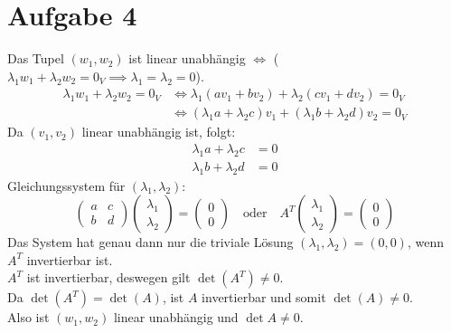 \documentclass{article}
\begin{document}
\section*{Aufgabe 4}
Das Tupel $(w_1, w_2)$ ist linear unabhängig $\iff$ ($\lambda_1 w_1 + \lambda_2 w_2 = 0_V \implies \lambda_1 = \lambda_2 = 0$).
\begin{align*} \lambda_1 w_1 + \lambda_2 w_2 = 0_V &\iff \lambda_1 (a v_1 + b v_2) + \lambda_2 (c v_1 + d v_2) = 0_V \\ &\iff (\lambda_1 a + \lambda_2 c) v_1 + (\lambda_1 b + \lambda_2 d) v_2 = 0_V\end{align*}
Da $(v_1, v_2)$ linear unabhängig ist, folgt:
\begin{align*} \lambda_1 a + \lambda_2 c &= 0 \\ \lambda_1 b + \lambda_2 d &= 0 \end{align*}
Gleichungssystem für $(\lambda_1, \lambda_2)$:
$$ \begin{pmatrix} a & c \\ b & d \end{pmatrix} \begin{pmatrix} \lambda_1 \\ \lambda_2 \end{pmatrix} = \begin{pmatrix} 0 \\ 0 \end{pmatrix} \quad \text{oder} \quad A^T \begin{pmatrix} \lambda_1 \\ \lambda_2 \end{pmatrix} = \begin{pmatrix} 0 \\ 0 \end{pmatrix} $$
Das System hat genau dann nur die triviale Lösung $(\lambda_1, \lambda_2) = (0, 0)$, wenn $A^T$ invertierbar ist. \\
$A^T$ ist invertierbar, deswegen gilt $\det(A^T) \neq 0$. \\
Da $\det(A^T) = \det(A)$, ist $A$ invertierbar und somit $\det(A) \neq 0$. \\
Also ist $(w_1, w_2)$ linear unabhängig und $\det A \neq 0$. 
\end{document}
